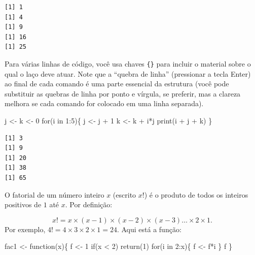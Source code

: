 \documentclass[
  letterpaper,
  DIV=11,
  numbers=noendperiod]{scrreprt}
\newenvironment{Shaded}{\begin{snugshade}}{\end{snugshade}}
\newcommand{\ControlFlowTok}[1]{\textcolor[rgb]{0.00,0.23,0.31}{#1}}
\newcommand{\DecValTok}[1]{\textcolor[rgb]{0.68,0.00,0.00}{#1}}
\newcommand{\FunctionTok}[1]{\textcolor[rgb]{0.28,0.35,0.67}{#1}}
\newcommand{\NormalTok}[1]{\textcolor[rgb]{0.00,0.23,0.31}{#1}}
\newcommand{\OtherTok}[1]{\textcolor[rgb]{0.00,0.23,0.31}{#1}}
\newcommand{\SpecialCharTok}[1]{\textcolor[rgb]{0.37,0.37,0.37}{#1}}
\begin{document}
\begin{verbatim}
[1] 1
[1] 4
[1] 9
[1] 16
[1] 25
\end{verbatim}

Para várias linhas de código, você usa chaves \texttt{\{\}} para incluir
o material sobre o qual o laço deve atuar. Note que a ``quebra de
linha'' (pressionar a tecla Enter) ao final de cada comando é uma parte
essencial da estrutura (você pode substituir as quebras de linha por
ponto e vírgula, se preferir, mas a clareza melhora se cada comando for
colocado em uma linha separada).

\begin{Shaded}
\begin{Highlighting}[]
\NormalTok{j }\OtherTok{\textless{}{-}}\NormalTok{ k }\OtherTok{\textless{}{-}} \DecValTok{0}
\ControlFlowTok{for}\NormalTok{(i }\ControlFlowTok{in} \DecValTok{1}\SpecialCharTok{:}\DecValTok{5}\NormalTok{)\{}
\NormalTok{j }\OtherTok{\textless{}{-}}\NormalTok{ j }\SpecialCharTok{+} \DecValTok{1}
\NormalTok{k }\OtherTok{\textless{}{-}}\NormalTok{ k }\SpecialCharTok{+}\NormalTok{ i}\SpecialCharTok{*}\NormalTok{j}
\FunctionTok{print}\NormalTok{(i }\SpecialCharTok{+}\NormalTok{ j }\SpecialCharTok{+}\NormalTok{ k)}
\NormalTok{\}}
\end{Highlighting}
\end{Shaded}

\begin{verbatim}
[1] 3
[1] 9
[1] 20
[1] 38
[1] 65
\end{verbatim}

O fatorial de um número inteiro \(x\) (escrito \(x!\)) é o produto de
todos os inteiros positivos de \(1\) até \(x\). Por definição:

\[x! = x \times (x-1) \times (x-2) \times (x-3)\dots \times 2 \times 1.\]
Por exemplo, \(4! = 4\times 3 \times 2 \times 1 = 24\). Aqui está a
função:

\begin{Shaded}
\begin{Highlighting}[]
\NormalTok{fac1 }\OtherTok{\textless{}{-}} \ControlFlowTok{function}\NormalTok{(x)\{}
\NormalTok{f }\OtherTok{\textless{}{-}} \DecValTok{1}
\ControlFlowTok{if}\NormalTok{(x }\SpecialCharTok{\textless{}} \DecValTok{2}\NormalTok{) }\FunctionTok{return}\NormalTok{(}\DecValTok{1}\NormalTok{)}
  \ControlFlowTok{for}\NormalTok{(i }\ControlFlowTok{in} \DecValTok{2}\SpecialCharTok{:}\NormalTok{x)\{}
\NormalTok{    f }\OtherTok{\textless{}{-}}\NormalTok{ f}\SpecialCharTok{*}\NormalTok{i}
\NormalTok{  \}}
\NormalTok{f}
\NormalTok{\}}
\end{Highlighting}
\end{Shaded}
\end{document}

